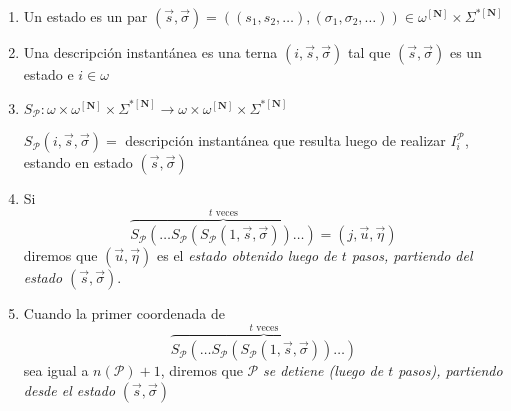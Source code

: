 \documentclass{article}
\begin{document}
\begin{enumerate}
    \item Un estado es un par $(\overset{\rightarrow}{s}, \overset{\rightarrow}{\sigma}) = 
    ((s_1, s_2, \dots), (\sigma_1, \sigma_2, \dots))
    \in \omega^{[\mathbf{N}]} \times \Sigma^{*[\mathbf{N}]}$

    \item Una descripción instantánea es una terna 
    $(i, \overset{\rightarrow}{s}, \overset{\rightarrow}{\sigma})$ tal que 
    $(\overset{\rightarrow}{s}, \overset{\rightarrow}{\sigma})$ es un estado e $i \in \omega$

    \item $S_{\mathcal{P}} : \omega \times \omega^{[\mathbf{N}]} \times \Sigma^{*[\mathbf{N}]}
    \rightarrow \omega \times \omega^{[\mathbf{N}]} \times \Sigma^{*[\mathbf{N}]}$

    \begin{center}
        $S_{\mathcal{P}} (i, \overset{\rightarrow}{s}, \overset{\rightarrow}{\sigma}) = $
        descripción instantánea que resulta luego de realizar $I_i^{\mathcal{P}}$,
        estando en estado $(\overset{\rightarrow}{s}, \overset{\rightarrow}{\sigma})$
    \end{center}

    \item Si
                \[
                \overbrace{S_{\mathcal{P}}(\dots S_{\mathcal{P}}(S_{\mathcal{P}}(1, \vec{s}, \vec{\sigma})) \dots)}^{t \text{ veces}} = (j, \vec{u}, \vec{\eta})
                \]
                diremos que \( (\vec{u}, \vec{\eta}) \) es el \textit{estado obtenido luego de \( t \) pasos, partiendo del estado \( (\vec{s}, \vec{\sigma}) \)}.

    \item Cuando la primer coordenada de 
                \[
                \overbrace{S_{\mathcal{P}}(\dots S_{\mathcal{P}}(S_{\mathcal{P}}(1, \vec{s}, \vec{\sigma})) \dots)}^{t \text{ veces}}
                \]
                sea igual a $n(\mathcal{P}) + 1$, diremos que $\mathcal{P}$ 
                \textit{se detiene (luego de $t$ pasos), partiendo
                desde el estado} $(\overset{\rightarrow}{s}, \overset{\rightarrow}{\sigma})$
\end{enumerate}
\end{document}
